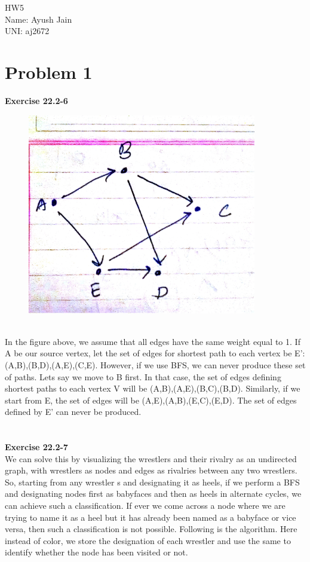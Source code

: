 \documentclass[10pt]{article}
\begin{document}
\vspace*{\fill}
\begin{Huge}
\begin{center}
HW5\\
Name: Ayush Jain\\
UNI: aj2672
\end{center}
\end{Huge}
\vspace*{\fill}
\newpage
\section{Problem 1}
\textbf{Exercise 22.2-6}\\
\begin{figure}[ht!]
\includegraphics[width=100mm]{image.JPG}
\end{figure}\\
In the figure above, we assume that all edges have the same weight equal to 1. If A be our source vertex, let the set of edges for shortest path to each vertex be E': (A,B),(B,D),(A,E),(C,E). However, if we use BFS, we can never produce these set of paths. Lets say we move to B first. In that case, the set of edges defining shortest paths to each vertex V will be (A,B),(A,E),(B,C),(B,D). Similarly, if we start from E, the set of edges will be (A,E),(A,B),(E,C),(E,D). The set of edges defined by E' can never be produced.\\\\\\
\textbf{Exercise 22.2-7}\\
We can solve this by visualizing the wrestlers and their rivalry as an undirected graph, with wrestlers as nodes and edges as rivalries between any two wrestlers. So, starting from any wrestler s and designating it as heels, if we perform a BFS and designating nodes first as babyfaces and then as heels in alternate cycles, we can achieve such a classification. If ever we come across a node where we are trying to name it as a heel but it has already been named as a babyface or vice versa, then such a classification is not possible. Following is the algorithm. Here instead of color, we store the designation of each wrestler and use the same to identify whether the node has been visited or not.\\\\
\end{document}
